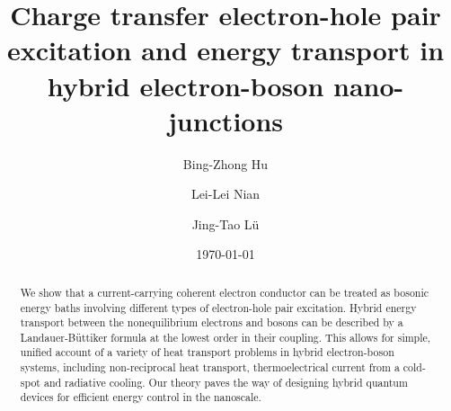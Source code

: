 \documentclass[aps
,twocolumn
,floatfix,footinbib,prl,longbibliography
]{revtex4-1}
\begin{document}


\title{Charge transfer electron-hole pair excitation and energy transport in hybrid electron-boson nano-junctions}
\author{Bing-Zhong Hu}
\author{Lei-Lei Nian}
\author{Jing-Tao L\"{u}}


\date{\today}%
\begin{abstract}

We show that a current-carrying coherent electron conductor can be treated as bosonic energy baths involving different types of electron-hole pair excitation. Hybrid energy transport between the nonequilibrium electrons and bosons can be described by a Landauer-B\"uttiker formula at the lowest order in their coupling. This allows for simple, unified account of a variety of heat transport problems in hybrid electron-boson systems, including non-reciprocal heat transport, thermoelectrical current from a cold-spot and radiative cooling. Our theory paves the way of designing hybrid quantum devices for efficient energy control in the nanoscale.
\end{abstract}


\maketitle
\end{document}
